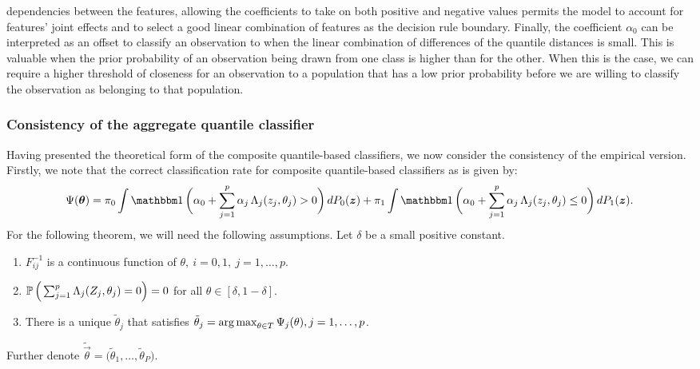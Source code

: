 dependencies between the features, allowing the coefficients to take on both
positive and negative values permits the model to account for features' joint
effects and to select a good linear combination of features as the decision rule
boundary.  Finally, the coefficient $\alpha_0$ can be interpreted as an offset
to classify an observation to when the linear combination of differences of the
quantile distances is small.  This is valuable when the prior probability of an
observation being drawn from one class is higher than for the other.  When this
is the case, we can require a higher threshold of closeness for an observation
to a population that has a low prior probability before we are willing to
classify the observation as belonging to that population.


\subsubsection{Consistency of the aggregate quantile classifier}
\label{sec:aggregate-classifier-consistency}

Having presented the theoretical form of the composite quantile-based
classifiers, we now consider the consistency of the empirical version.  Firstly,
we note that the correct classification rate for composite quantile-based
classifiers as is given by:
\begin{equation}
  \label{eq:multivariate-theoretical-rate}
  \Psi(\vec{\theta}) =
  \pi_0 \int \ind\bigg(
  \alpha_0 + \sum_{j=1}^p \alpha_j \, \Lambda_j (z_j, \theta_j) > 0
  \bigg)\, dP_0(\vec{z}) +
  \pi_1 \int \ind\bigg(
  \alpha_0 + \sum_{j=1}^p \alpha_j \, \Lambda_j (z_j, \theta_j) \leq 0
  \bigg)\, dP_1(\vec{z}).
\end{equation}
For the following theorem, we will need the following assumptions.  Let $\delta$
be a small positive constant.
\begin{enumerate}[label=\emph{Assumption \arabic*.}, align=left]
\item $F_{ij}^{-1}$ is a continuous function of
  $\theta,~ i=0,1,~ j=1, \dots, p$.
\item $\mathbb{P}\,\Big(
  \sum_{j=1}^p \Lambda_j (Z_j, \theta_j) = 0
  \Big) = 0$ for all
  $\theta \in [\delta, 1 - \delta]$.
\item There is a unique $\tilde{\theta}_j$ that satisfies
  $\tilde{\theta}_j = \operatorname*{arg\,max}_{\theta \in T} \Psi_j(\theta), j = 1, \dots, p$.
\end{enumerate}
Further denote
$\tilde{\vec{\theta}} = \Big( \tilde{\theta}_1, \dots, \tilde{\theta}_P \Big)$.
\vspace{5mm}

